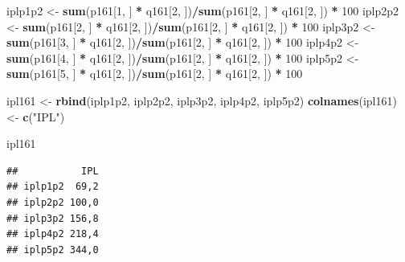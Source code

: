 \documentclass[
]{book}
\newenvironment{Shaded}{\begin{snugshade}}{\end{snugshade}}
\newcommand{\DecValTok}[1]{\textcolor[rgb]{0.00,0.00,0.81}{#1}}
\newcommand{\KeywordTok}[1]{\textcolor[rgb]{0.13,0.29,0.53}{\textbf{#1}}}
\newcommand{\NormalTok}[1]{#1}
\newcommand{\OperatorTok}[1]{\textcolor[rgb]{0.81,0.36,0.00}{\textbf{#1}}}
\newcommand{\StringTok}[1]{\textcolor[rgb]{0.31,0.60,0.02}{#1}}
\begin{document}
\begin{Shaded}
\begin{Highlighting}[]
\NormalTok{iplp1p2 <-}\StringTok{ }\KeywordTok{sum}\NormalTok{(p161[}\DecValTok{1}\NormalTok{, ] }\OperatorTok{*}\StringTok{ }\NormalTok{q161[}\DecValTok{2}\NormalTok{, ])}\OperatorTok{/}\KeywordTok{sum}\NormalTok{(p161[}\DecValTok{2}\NormalTok{, ] }\OperatorTok{*}\StringTok{ }
\StringTok{    }\NormalTok{q161[}\DecValTok{2}\NormalTok{, ]) }\OperatorTok{*}\StringTok{ }\DecValTok{100}
\NormalTok{iplp2p2 <-}\StringTok{ }\KeywordTok{sum}\NormalTok{(p161[}\DecValTok{2}\NormalTok{, ] }\OperatorTok{*}\StringTok{ }\NormalTok{q161[}\DecValTok{2}\NormalTok{, ])}\OperatorTok{/}\KeywordTok{sum}\NormalTok{(p161[}\DecValTok{2}\NormalTok{, ] }\OperatorTok{*}\StringTok{ }
\StringTok{    }\NormalTok{q161[}\DecValTok{2}\NormalTok{, ]) }\OperatorTok{*}\StringTok{ }\DecValTok{100}
\NormalTok{iplp3p2 <-}\StringTok{ }\KeywordTok{sum}\NormalTok{(p161[}\DecValTok{3}\NormalTok{, ] }\OperatorTok{*}\StringTok{ }\NormalTok{q161[}\DecValTok{2}\NormalTok{, ])}\OperatorTok{/}\KeywordTok{sum}\NormalTok{(p161[}\DecValTok{2}\NormalTok{, ] }\OperatorTok{*}\StringTok{ }
\StringTok{    }\NormalTok{q161[}\DecValTok{2}\NormalTok{, ]) }\OperatorTok{*}\StringTok{ }\DecValTok{100}
\NormalTok{iplp4p2 <-}\StringTok{ }\KeywordTok{sum}\NormalTok{(p161[}\DecValTok{4}\NormalTok{, ] }\OperatorTok{*}\StringTok{ }\NormalTok{q161[}\DecValTok{2}\NormalTok{, ])}\OperatorTok{/}\KeywordTok{sum}\NormalTok{(p161[}\DecValTok{2}\NormalTok{, ] }\OperatorTok{*}\StringTok{ }
\StringTok{    }\NormalTok{q161[}\DecValTok{2}\NormalTok{, ]) }\OperatorTok{*}\StringTok{ }\DecValTok{100}
\NormalTok{iplp5p2 <-}\StringTok{ }\KeywordTok{sum}\NormalTok{(p161[}\DecValTok{5}\NormalTok{, ] }\OperatorTok{*}\StringTok{ }\NormalTok{q161[}\DecValTok{2}\NormalTok{, ])}\OperatorTok{/}\KeywordTok{sum}\NormalTok{(p161[}\DecValTok{2}\NormalTok{, ] }\OperatorTok{*}\StringTok{ }
\StringTok{    }\NormalTok{q161[}\DecValTok{2}\NormalTok{, ]) }\OperatorTok{*}\StringTok{ }\DecValTok{100}

\NormalTok{ipl161 <-}\StringTok{ }\KeywordTok{rbind}\NormalTok{(iplp1p2, iplp2p2, iplp3p2, iplp4p2, }
\NormalTok{    iplp5p2)}
\KeywordTok{colnames}\NormalTok{(ipl161) <-}\StringTok{ }\KeywordTok{c}\NormalTok{(}\StringTok{"IPL"}\NormalTok{)}

\NormalTok{ipl161}
\end{Highlighting}
\end{Shaded}

\begin{verbatim}
##           IPL
## iplp1p2  69,2
## iplp2p2 100,0
## iplp3p2 156,8
## iplp4p2 218,4
## iplp5p2 344,0
\end{verbatim}
\end{document}
